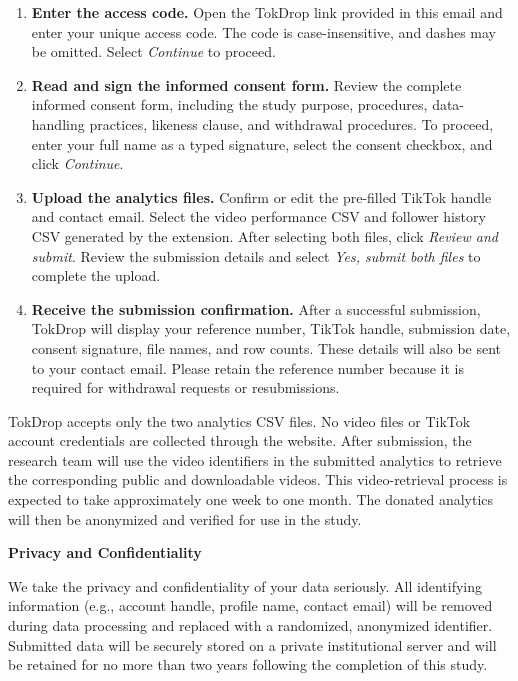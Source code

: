 \begin{enumerate}
    \item \textbf{Enter the access code.} Open the TokDrop link provided in this email and enter your unique access code. The code is case-insensitive, and dashes may be omitted. Select \textit{Continue} to proceed.

    \item \textbf{Read and sign the informed consent form.} Review the complete informed consent form, including the study purpose, procedures, data-handling practices, likeness clause, and withdrawal procedures. To proceed, enter your full name as a typed signature, select the consent checkbox, and click \textit{Continue}.

    \item \textbf{Upload the analytics files.} Confirm or edit the pre-filled TikTok handle and contact email. Select the video performance CSV and follower history CSV generated by the extension. After selecting both files, click \textit{Review and submit}. Review the submission details and select \textit{Yes, submit both files} to complete the upload.

    \item \textbf{Receive the submission confirmation.} After a successful submission, TokDrop will display your reference number, TikTok handle, submission date, consent signature, file names, and row counts. These details will also be sent to your contact email. Please retain the reference number because it is required for withdrawal requests or resubmissions.
\end{enumerate}

TokDrop accepts only the two analytics CSV files. No video files or TikTok account credentials are collected through the website. After submission, the research team will use the video identifiers in the submitted analytics to retrieve the corresponding public and downloadable videos. This video-retrieval process is expected to take approximately one week to one month. The donated analytics will then be anonymized and verified for use in the study.

\noindent\textbf{Privacy and Confidentiality}

We take the privacy and confidentiality of your data seriously. All identifying information (e.g., account handle, profile name, contact email) will be removed during data processing and replaced with a randomized, anonymized identifier. Submitted data will be securely stored on a private institutional server and will be retained for no more than two years following the completion of this study.

